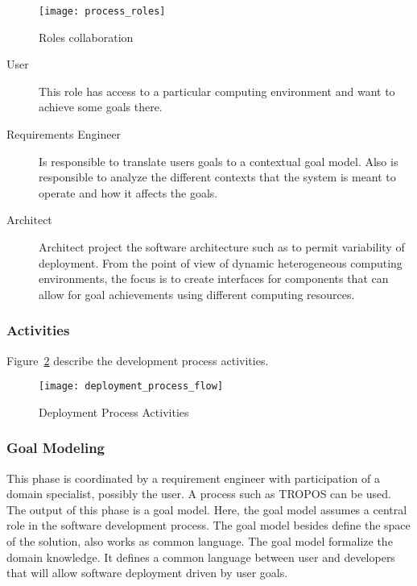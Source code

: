  \begin{figure}[!htb]
   \centering
   \texttt{[image: process\_roles]}
   \caption{Roles collaboration}
 \label{fig:process_roles}
 \end{figure}

\begin{description}
  \item[User]
  This role has access to a particular computing environment and want to achieve some goals there.
  \item[Requirements Engineer]
  Is responsible to translate users goals to a contextual goal model. Also is responsible to analyze the different contexts that the system is meant to operate and how it affects the goals.
  \item[Architect] Architect project the software architecture such as to permit variability of deployment.
  From the point of view of dynamic heterogeneous computing environments, the focus is to create interfaces for components that can allow for goal achievements using different computing resources.

\end{description}



\subsubsection{Activities}

Figure~\ref{fig:deployment_process_flow} describe the development process activities.

\label{sub:Proposal}
\begin{figure}[!htb]
  \centering
  \texttt{[image: deployment\_process\_flow]}
  \caption{Deployment Process Activities}
\label{fig:deployment_process_flow}
\end{figure}

\subsubsection{Goal Modeling}
This phase is coordinated by a requirement engineer with participation of a domain specialist, possibly the user.
A process such as TROPOS can be used. The output of this phase is a goal model.
Here, the goal model assumes a central role in the software development process. The goal model besides define the space of the solution, also works as common language. The goal model formalize the domain knowledge. It defines a common language between user and developers that will allow software deployment driven by user goals.


